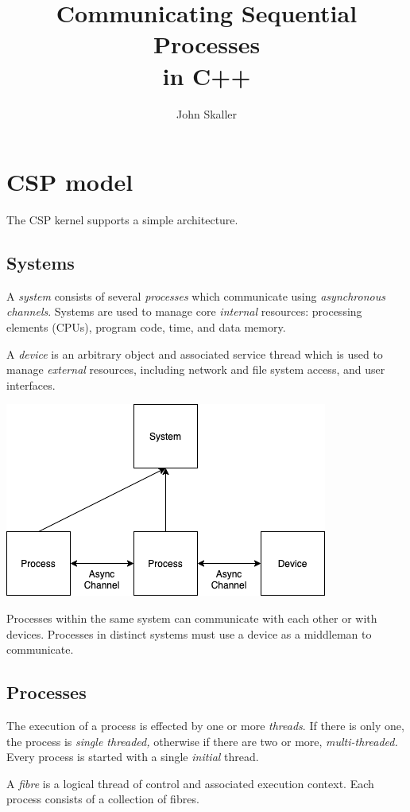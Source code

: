 \documentclass[oneside]{book}
\title{Communicating Sequential Processes\\ in C++}
\author{John Skaller}
\begin{document}
\maketitle
\tableofcontents
\chapter{CSP model}
The CSP kernel supports a simple architecture.

\section{Systems}
A {\em system} consists of several {\em processes} which communicate
using {\em asynchronous channels}. Systems are used to manage 
core {\em internal} resources: processing elements (CPUs), program code,
time, and data memory.

A {\em device} is an arbitrary object and associated service thread which is
used to manage {\em external} resources, including network and file system access,
and user interfaces.


\includegraphics{../src/tex/system.png}

Processes within the same system can communicate with each other or
with devices. Processes in distinct systems must use a device as
a middleman to communicate.

\section{Processes}
The execution of a process is effected by one or more {\em threads}.
If there is only one, the process is {\em single threaded,} otherwise
if there are two or more, {\em multi-threaded.} Every process is started
with a single {\em initial} thread.

A {\em fibre} is a logical thread of control and associated execution
context. Each process consists of a collection of fibres. 
\end{document}
